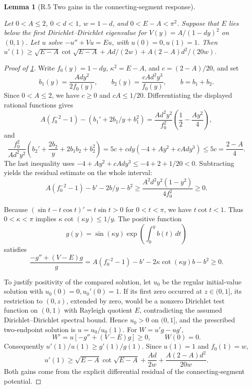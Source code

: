 \documentclass[11pt,a4paper]{article}
\theoremstyle{proofmanuscript}
\newtheorem{lemma}[theorem]{Lemma}
\begin{document}
\begin{lemma}[R.5 Two gains in the connecting-segment response]\label{lem-head-response}

Let \(0<A\le2\), \(0<d<1\), \(w=1-d\), and \(0<E-A<\pi^2\). Suppose that \(E\) lies below the first Dirichlet--Dirichlet eigenvalue for \(V(y)=A/(1-dy)^2\) on \((0,1)\). Let \(u\) solve \(-u''+Vu=Eu\), with \(u(0)=0,u(1)=1\). Then \(u'(1)\ge\sqrt{E-A}\cot\sqrt{E-A}+Ad/(2w)+A(2-A)d^2/(20w)\).

\end{lemma}

\begin{proof}[Proof of \ref{lem-head-response}]

Write \(f_0(y)=1-dy\), \(\kappa^2=E-A\), and \(c=(2-A)/20\), and set \[
b_1(y)=\frac{Ady^2}{2f_0(y)},\qquad
b_2(y)=\frac{cAd^2y^3}{f_0(y)},\qquad b=b_1+b_2.
\] Since \(0<A\le2\), we have \(c\ge0\) and \(cA\le1/20\). Differentiating the displayed rational functions gives \[
A(f_0^{-2}-1)-(b_1'+2b_1/y+b_1^2)
=\frac{Ad^2y^2}{f_0^2}\left(\frac12-\frac{Ay^2}{4}\right),
\] and \[
\frac{f_0^2}{Ad^2y^2}
\left(b_2'+\frac{2b_2}y+2b_1b_2+b_2^2\right)
=5c+cdy(-4+Ay^2+cAdy^3)\le5c=\frac{2-A}{4}.
\] The last inequality uses \(-4+Ay^2+cAdy^3\le-4+2+1/20<0\). Subtracting yields the residual estimate on the whole interval: \[
A(f_0^{-2}-1)-b'-2b/y-b^2
\ge\frac{A^2d^2y^2(1-y^2)}{4f_0^2}\ge0.\tag{R.5.0}
\]

Because \((\sin t-t\cos t)'=t\sin t>0\) for \(0<t<\pi\), we have \(t\cot t<1\). Thus \(0<\kappa<\pi\) implies \(\kappa\cot(\kappa y)\le1/y\). The positive function \[
g(y)=\sin(\kappa y)\exp\!\left(\int_0^y b(t)\,dt\right)
\] satisfies \[
\frac{-g''+(V-E)g}{g}
=A(f_0^{-2}-1)-b'-2\kappa\cot(\kappa y)b-b^2\ge0.
\]

To justify positivity of the compared solution, let \(u_0\) be the regular initial-value solution with \(u_0(0)=0,u_0'(0)=1\). If its first zero occurred at \(z\in(0,1]\), its restriction to \((0,z)\), extended by zero, would be a nonzero Dirichlet test function on \((0,1)\) with Rayleigh quotient \(E\), contradicting the assumed Dirichlet--Dirichlet spectral bound. Hence \(u_0>0\) on \((0,1]\), and the prescribed two-endpoint solution is \(u=u_0/u_0(1)\). For \(W=u'g-ug'\), \[
W'=u[-g''+(V-E)g]\ge0,\qquad W(0)=0.
\] Consequently \(u'(1)/u(1)\ge g'(1)/g(1)\). Since \(u(1)=1\) and \(f_0(1)=w\), \[
u'(1)\ge\sqrt{E-A}\cot\sqrt{E-A}
+\frac{Ad}{2w}+\frac{A(2-A)d^2}{20w}.\tag{R.5.1}
\] Both gains come from the explicit differential residual of the connecting-segment potential.

\end{proof}
\end{document}
